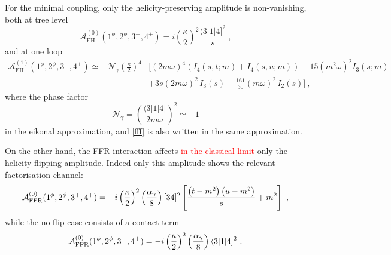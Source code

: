 \documentclass[a4paper,11pt]{article}
\numberwithin{equation}{section}
\newcommand{\sqr}[2]{\lbrack #1 #2 \rbrack}
\newcommand{\cA}{\mathcal{A}}
\newcommand{\cN}{\mathcal{N}}
\def\cA{\mathcal{A}}
\begin{document}
For the minimal coupling, only the helicity-preserving amplitude is non-vanishing,  both at tree level
\begin{equation}\label{eq:EHphotontree}
    \cA^{(0)}_{\mathrm{EH}} (1^\phi , 2^\phi , 3^{-} , 4^{+}) = i \left(\frac{\kappa}{2}\right)^2 \frac{\langle 3 | 1 | 4 \rbrack^2}{s}\ ,
\end{equation}
and at one loop  \cite{Bjerrum-Bohr:2016hpa}
\begin{equation}
    \begin{split}
    \label{fff}
        \cA^{(1)}_{\mathrm{EH}} (1^\phi , 2^\phi , 3^{-} , 4^{+}) \simeq - \cN_\gamma \left(\frac{\kappa}{2}\right)^4 &\Bigg[(2 m \omega)^4 \left(I_4 (s, t;m) + I_4 (s, u;m)\right) -15(m^2 \omega)^2 I_3 (s;m) \\
        &  + 3s(2m\omega)^2 \, I_3(s) - \frac{161}{30} (m\omega)^2 \, I_2(s) \Bigg]\ ,
    \end{split}
\end{equation}
where the phase factor
\begin{equation}
    \cN_\gamma = \left(\frac{\langle 3 | 1 | 4 \rbrack}{2 m \omega} \right)^2 \simeq -1
\end{equation}
in the eikonal approximation, and \eqref{fff} is also written in the same approximation.

On the other hand, the FFR interaction affects \textcolor{red}{ in the classical limit} only the helicity-flipping amplitude. Indeed only this amplitude shows the relevant factorisation channel:
\begin{equation}
    \cA^{(0)}_{\rm FFR} (1^\phi , 2^\phi , 3^{+} , 4^{+}) = - i \left(\frac{\kappa}{2}\right)^2 \left(\frac{\alpha_\gamma}{8}\right) \sqr{3}{4}^2 \left[\frac{\left(t-m^2\right)\left(u-m^2\right)}{s} + m^2\right]\ ,
\end{equation}
while the no-flip case consists of a contact term
\begin{equation}
    \cA^{(0)}_{\rm FFR} (1^\phi , 2^\phi , 3^{-} , 4^{+}) = - i \left(\frac{\kappa}{2}\right)^2 \left(\frac{\alpha_\gamma}{8}\right) \langle 3 | 1 | 4 \rbrack^2\ .
\end{equation}
\end{document}
